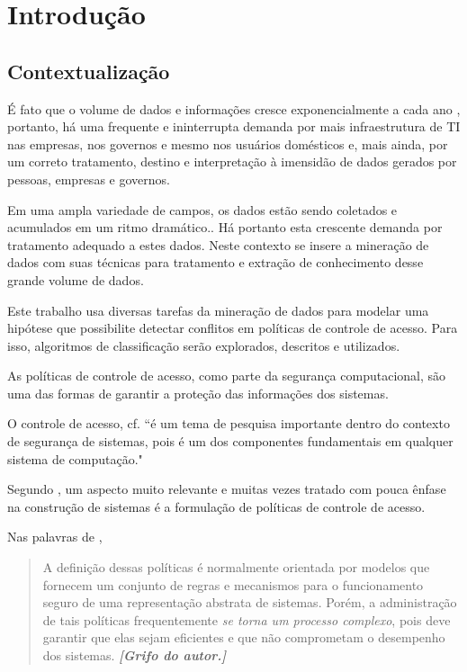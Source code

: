 \chapter{Introdução} \label{introducao}
\section{Contextualização} \label{contextualizacao}
É fato que o volume de dados e informações cresce exponencialmente a cada ano \cite{alecrim2019}, portanto, há uma frequente e ininterrupta demanda por mais infraestrutura de TI nas empresas, nos governos e mesmo nos usuários domésticos \cite{machado2014} e, mais ainda, por um correto tratamento, destino e interpretação à imensidão de dados gerados por pessoas, empresas e governos. 

Em uma ampla variedade de campos, os dados estão sendo coletados e acumulados em um ritmo dramático.\cite{fayyad1996}\cite{lima_fraud_2012}. Há portanto esta crescente demanda por tratamento adequado a estes dados. Neste contexto se insere a mineração de dados com suas técnicas para tratamento e extração de conhecimento desse grande volume de dados.\cite{Boscarioli2017}\cite{ferrari2017}

Este trabalho usa diversas tarefas da mineração de dados para modelar uma hipótese que possibilite detectar conflitos em políticas de controle de acesso. Para isso, algoritmos de classificação serão explorados, descritos e utilizados.

As políticas de controle de acesso, como parte da segurança computacional, são uma das formas de garantir a proteção das informações dos sistemas.\cite{sarkis2017}

O controle de acesso, cf. \cite[p.1]{ueda_tese_2012} ``é um tema de pesquisa importante dentro do contexto de segurança de sistemas, pois é um dos componentes fundamentais em qualquer sistema de computação."

Segundo \cite{li_security_2006}, um aspecto muito relevante e muitas vezes tratado com pouca ênfase na construção de sistemas é a formulação de políticas de controle de acesso. 

Nas palavras de \cite[p.1]{ueda_tese_2012},
\begin{quotation}
	A definição dessas políticas é normalmente orientada por modelos que fornecem um conjunto de regras e mecanismos para o funcionamento seguro de uma representação abstrata de sistemas. Porém, a administração de tais políticas frequentemente \textit{se torna um processo complexo}, pois deve garantir que elas sejam eficientes e que não comprometam o desempenho dos sistemas. \textbf{\emph{[Grifo do autor.]}}
\end{quotation}

